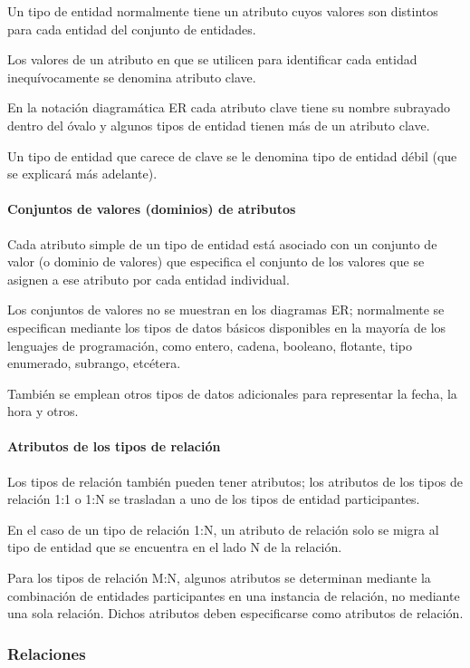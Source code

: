 Un tipo de entidad normalmente tiene un atributo cuyos valores son distintos para cada entidad del conjunto de entidades.


Los valores de un atributo en que se utilicen para identificar cada entidad inequívocamente se denomina atributo clave.


En la notación diagramática ER cada atributo clave tiene su nombre subrayado dentro del óvalo y algunos tipos de entidad tienen más de un atributo clave. 


Un tipo de entidad que carece de clave se le denomina tipo de entidad débil (que se explicará más adelante).


\paragraph*{Conjuntos de valores (dominios) de atributos} Cada atributo simple de un tipo de entidad está asociado con un conjunto de valor (o dominio de valores) que especifica el conjunto de los valores que se asignen a ese atributo por cada entidad individual. 


Los conjuntos de valores no se muestran en los diagramas ER; normalmente se especifican mediante los tipos de datos básicos disponibles en la mayoría de los lenguajes de programación, como entero, cadena, booleano, flotante, tipo enumerado, subrango, etcétera. 


También se emplean otros tipos de datos adicionales para representar la fecha, la hora y otros.

\paragraph*{Atributos de los tipos de relación}


Los tipos de relación también pueden tener atributos; los atributos de los tipos de relación 1:1 o 1:N se trasladan a uno de los tipos de entidad participantes.


En el caso de un tipo de relación 1:N, un atributo de relación solo se migra al tipo de entidad que se encuentra en el lado N de la relación. 


Para los tipos de relación M:N, algunos atributos se determinan mediante la combinación de entidades participantes en una instancia de relación, no mediante una sola relación. Dichos atributos deben especificarse como atributos de relación.

\subsubsection{Relaciones}

